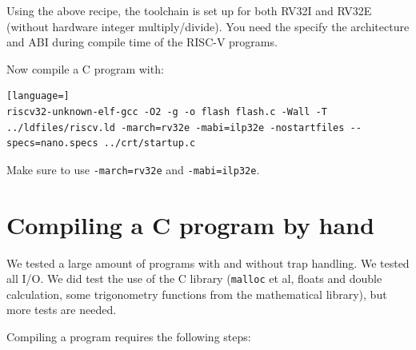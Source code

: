 \documentclass[12pt]{article}
\begin{document}
Using the above recipe, the toolchain is set up for both RV32I and RV32E (without hardware integer multiply/divide). You need the specify the architecture and ABI during compile time of the RISC-V programs.

Now compile a C program with:

\begin{lstlisting}[language=]
riscv32-unknown-elf-gcc -O2 -g -o flash flash.c -Wall -T ../ldfiles/riscv.ld -march=rv32e -mabi=ilp32e -nostartfiles --specs=nano.specs ../crt/startup.c
\end{lstlisting}

Make sure to use \lstinline|-march=rv32e| and \lstinline|-mabi=ilp32e|.


\section{Compiling a C program by hand}
We tested a large amount of programs with and without trap handling. We tested all I/O. We did test the use of the C library (\lstinline|malloc| et al, floats and double calculation, some trigonometry functions from the mathematical library), but more tests are needed.

Compiling a program requires the following steps:
\end{document}
